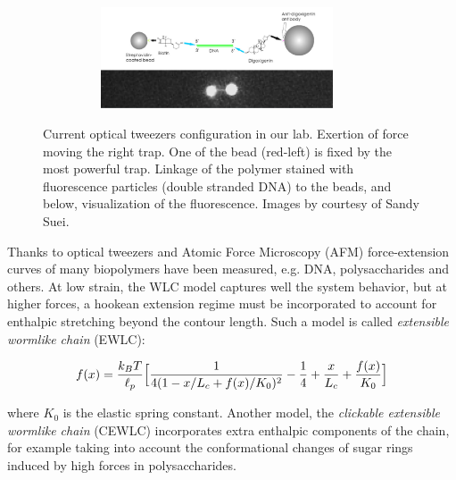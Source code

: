 \begin{figure}[ht]
\begin{minipage}{0.35\textwidth}
  \begin{subfigure}{0.99\textwidth}
    \includegraphics[width=0.9\textwidth,height=3cm]{Figures/chapter-intro/tweezers_linkage.png}%
    \caption{\label{tweezers-linkage}}
  \end{subfigure}
\end{minipage}

\caption[Optical Tweezers]{\protect{} Current
optical tweezers configuration in our lab. \protect{}
Exertion of force moving the right trap. One of the bead (red-left) is fixed by
the most powerful trap. \protect{} Linkage of the
 polymer stained with fluorescence particles (double stranded DNA) to the beads,
 and below, visualization of the fluorescence. Images by courtesy of Sandy Suei. }
\label{fig:optical_tweezers}
\end{figure}


Thanks to optical tweezers and Atomic Force Microscopy
(AFM)\citep{janshoff_force_2000} force-extension curves of many
biopolymers have been measured, e.g. DNA\citep{marko_stretching_1995},
polysaccharides\citep{marszalek_atomic_1999} and others. At low strain, the WLC
model captures well the system behavior, but at higher forces, a hookean
extension regime must be incorporated to account for enthalpic stretching
beyond the contour length.
Such a model is called \emph{extensible wormlike chain}
(EWLC)\citep{wang_stretching_1997}:

\begin{equation}\label{EWLC}
f(x)=\frac{k_B{}T}{\ell_p} \Big[ \frac{1}{4(1 - x/L_c + f(x)/K_0)^2}
-\frac{1}{4}+\frac{x}{L_c} + \frac{f(x)}{K_0}\Big]
\end{equation}


where $K_0$ is the elastic spring constant. Another model, the
\emph{clickable extensible wormlike chain} (CEWLC) incorporates extra
enthalpic components of the chain, for example taking into
account the conformational changes of sugar rings induced by high forces in polysaccharides\citep{haverkamp_model_2007}.


